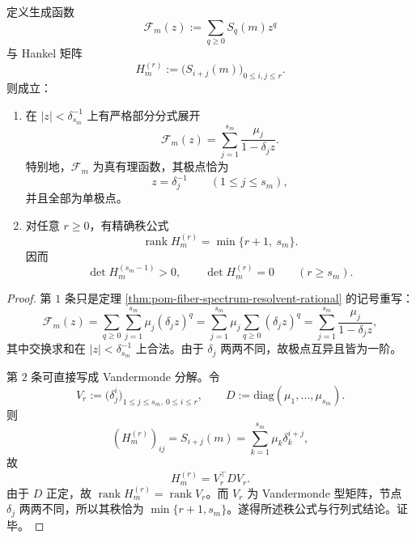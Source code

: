 \begin{theorem}\label{thm:conclusion-fixedresolution-collision-rational-hankel-rank}
定义生成函数
\[
\mathcal F_m(z):=\sum_{q\ge 0}S_q(m)z^q
\]
与 Hankel 矩阵
\[
H_m^{(r)}:=\bigl(S_{i+j}(m)\bigr)_{0\le i,j\le r}.
\]
则成立：
\begin{enumerate}
  \item 在 \(|z|<\delta_{s_m}^{-1}\) 上有严格部分分式展开
  \[
  \mathcal F_m(z)=\sum_{j=1}^{s_m}\frac{\mu_j}{1-\delta_j z}.
  \]
  特别地，\(\mathcal F_m\) 为真有理函数，其极点恰为
  \[
  z=\delta_j^{-1}\qquad(1\le j\le s_m),
  \]
  并且全部为单极点。

  \item 对任意 \(r\ge 0\)，有精确秩公式
  \[
  \operatorname{rank}H_m^{(r)}=\min\{r+1,\ s_m\}.
  \]
  因而
  \[
  \det H_m^{(s_m-1)}>0,
  \qquad
  \det H_m^{(r)}=0\qquad(r\ge s_m).
  \]
\end{enumerate}
\end{theorem}
\begin{proof}
第 \(1\) 条只是定理 \ref{thm:pom-fiber-spectrum-resolvent-rational} 的记号重写：
\[
\mathcal F_m(z)
=
\sum_{q\ge 0}\sum_{j=1}^{s_m}\mu_j(\delta_j z)^q
=
\sum_{j=1}^{s_m}\mu_j\sum_{q\ge 0}(\delta_j z)^q
=
\sum_{j=1}^{s_m}\frac{\mu_j}{1-\delta_j z},
\]
其中交换求和在 \(|z|<\delta_{s_m}^{-1}\) 上合法。由于 \(\delta_j\) 两两不同，故极点互异且皆为一阶。

第 \(2\) 条可直接写成 Vandermonde 分解。令
\[
V_r:=\bigl(\delta_j^i\bigr)_{1\le j\le s_m,\ 0\le i\le r},
\qquad
D:=\mathrm{diag}(\mu_1,\dots,\mu_{s_m}).
\]
则
\[
(H_m^{(r)})_{ij}=S_{i+j}(m)=\sum_{k=1}^{s_m}\mu_k\delta_k^{i+j},
\]
故
\[
H_m^{(r)}=V_r^{\!\top}DV_r.
\]
由于 \(D\) 正定，故 \(\operatorname{rank}H_m^{(r)}=\operatorname{rank}V_r\)。而 \(V_r\) 为 Vandermonde 型矩阵，节点 \(\delta_j\) 两两不同，所以其秩恰为 \(\min\{r+1,s_m\}\)。遂得所述秩公式与行列式结论。证毕。
\end{proof}

